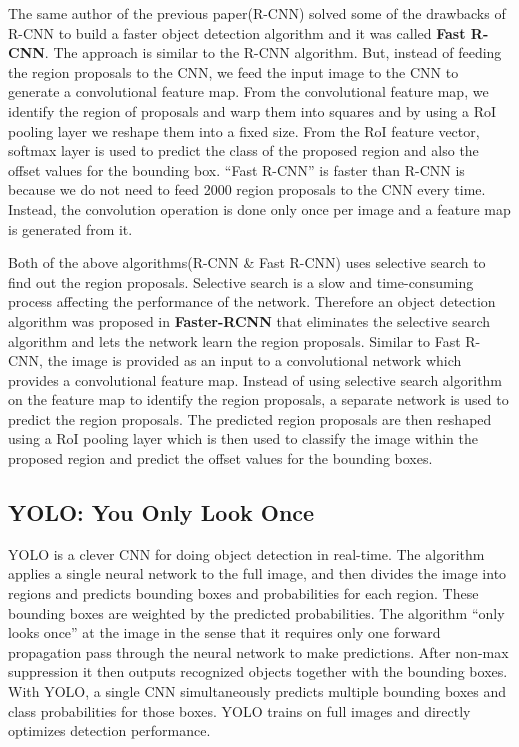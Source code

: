 The same author of the previous paper(R-CNN) solved some of the drawbacks of R-CNN to build a faster object detection algorithm and it was called \textbf{Fast R-CNN}. The approach is similar to the R-CNN algorithm. But, instead of feeding the region proposals to the CNN, we feed the input image to the CNN to generate a convolutional feature map. From the convolutional feature map, we identify the region of proposals and warp them into squares and by using a RoI pooling layer we reshape them into a fixed size. From the RoI feature vector, softmax layer is used to predict the class of the proposed region and also the offset values for the bounding box. “Fast R-CNN” is faster than R-CNN is because we do not need to feed 2000 region proposals to the CNN every time. Instead, the convolution operation is done only once per image and a feature map is generated from it.

Both of the above algorithms(R-CNN \& Fast R-CNN) uses selective search to find out the region proposals. Selective search is a slow and time-consuming process affecting the performance of the network. Therefore an object detection algorithm was proposed in \textbf{Faster-RCNN} that eliminates the selective search algorithm and lets the network learn the region proposals. Similar to Fast R-CNN, the image is provided as an input to a convolutional network which provides a convolutional feature map. Instead of using selective search algorithm on the feature map to identify the region proposals, a separate network is used to predict the region proposals. The predicted region proposals are then reshaped using a RoI pooling layer which is then used to classify the image within the proposed region and predict the offset values for the bounding boxes.

\subsection{YOLO: You Only Look Once}
YOLO \cite{yolo_core_paper} is a clever CNN for doing object detection in real-time. The algorithm applies a single neural network to the full image, and then divides the image into regions and predicts bounding boxes and probabilities for each region. These bounding boxes are weighted by the predicted probabilities. The algorithm “only looks once” at the image in the sense that it requires only one forward propagation pass through the neural network to make predictions. After non-max suppression it then outputs recognized objects together with the bounding boxes. With YOLO, a single CNN simultaneously predicts multiple bounding boxes and class probabilities for those boxes. YOLO trains on full images and directly optimizes detection performance. 

